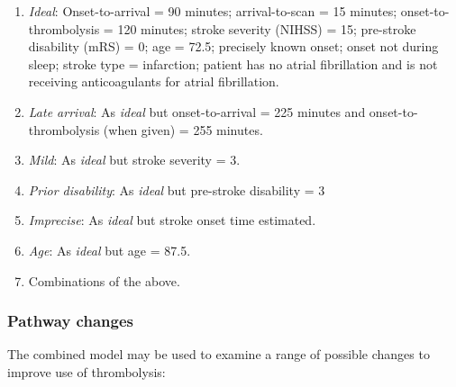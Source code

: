 \begin{enumerate}
    \item \textit{Ideal}: Onset-to-arrival = 90 minutes; arrival-to-scan = 15 minutes; onset-to-thrombolysis = 120 minutes; stroke severity (NIHSS) = 15; pre-stroke disability (mRS) = 0; age = 72.5; precisely known onset; onset not during sleep; stroke type = infarction; patient has no atrial fibrillation and is not receiving anticoagulants for atrial fibrillation.

    \item \textit{Late arrival}: As \textit{ideal} but onset-to-arrival = 225 minutes and onset-to-thrombolysis (when given) = 255 minutes.

    \item \textit{Mild}: As \textit{ideal} but stroke severity = 3.

    \item \textit{Prior disability}: As \textit{ideal} but pre-stroke disability = 3

    \item \textit{Imprecise}: As \textit{ideal} but stroke onset time estimated.

    \item \textit{Age}: As \textit{ideal} but age = 87.5.

    \item Combinations of the above.
\end{enumerate}


\subsubsection{Pathway changes}

The combined model may be used to examine a range of possible changes to improve use of thrombolysis:

